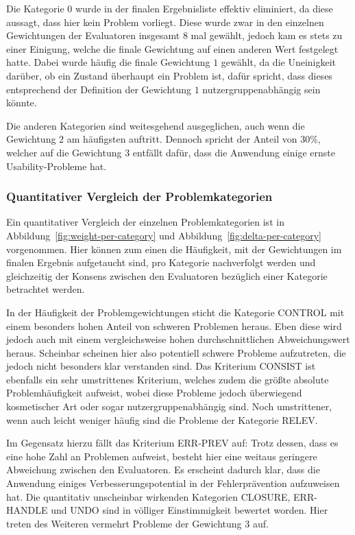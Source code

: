 \documentclass[
  12pt,
  ngerman,
  a4paper,
]{article}
\begin{document}
Die Kategorie \(0\) wurde in der finalen Ergebnisliste effektiv
eliminiert, da diese aussagt, dass hier kein Problem vorliegt. Diese
wurde zwar in den einzelnen Gewichtungen der Evaluatoren insgesamt 8 mal
gewählt, jedoch kam es stets zu einer Einigung, welche die finale
Gewichtung auf einen anderen Wert festgelegt hatte. Dabei wurde häufig
die finale Gewichtung \(1\) gewählt, da die Uneinigkeit darüber, ob ein
Zustand überhaupt ein Problem ist, dafür spricht, dass dieses
entsprechend der Definition der Gewichtung \(1\) nutzergruppenabhängig
sein könnte.

Die anderen Kategorien sind weitesgehend ausgeglichen, auch wenn die
Gewichtung \(2\) am häufigsten auftritt. Dennoch spricht der Anteil von
30\%, welcher auf die Gewichtung \(3\) entfällt dafür, dass die
Anwendung einige ernste Usability-Probleme hat.

\hypertarget{quantitativer-vergleich-der-problemkategorien}{%
\subsubsection{Quantitativer Vergleich der
Problemkategorien}\label{quantitativer-vergleich-der-problemkategorien}}

Ein quantitativer Vergleich der einzelnen Problemkategorien ist in
Abbildung~\ref{fig:weight-per-category} und
Abbildung~\ref{fig:delta-per-category} vorgenommen. Hier können zum
einen die Häufigkeit, mit der Gewichtungen im finalen Ergebnis
aufgetaucht sind, pro Kategorie nachverfolgt werden und gleichzeitig der
Konsens zwischen den Evaluatoren bezüglich einer Kategorie betrachtet
werden.

In der Häufigkeit der Problemgewichtungen sticht die Kategorie CONTROL
mit einem besonders hohen Anteil von schweren Problemen heraus. Eben
diese wird jedoch auch mit einem vergleichsweise hohen
durchschnittlichen Abweichungswert heraus. Scheinbar scheinen hier also
potentiell schwere Probleme aufzutreten, die jedoch nicht besonders klar
verstanden sind. Das Kriterium CONSIST ist ebenfalls ein sehr
umstrittenes Kriterium, welches zudem die größte absolute
Problemhäufigkeit aufweist, wobei diese Probleme jedoch überwiegend
kosmetischer Art oder sogar nutzergruppenabhängig sind. Noch
umstrittener, wenn auch leicht weniger häufig sind die Probleme der
Kategorie RELEV.

Im Gegensatz hierzu fällt das Kriterium ERR-PREV auf: Trotz dessen, dass
es eine hohe Zahl an Problemen aufweist, besteht hier eine weitaus
geringere Abweichung zwischen den Evaluatoren. Es erscheint dadurch
klar, dass die Anwendung einiges Verbesserungspotential in der
Fehlerprävention aufzuweisen hat. Die quantitativ unscheinbar wirkenden
Kategorien CLOSURE, ERR-HANDLE und UNDO sind in völliger Einstimmigkeit
bewertet worden. Hier treten des Weiteren vermehrt Probleme der
Gewichtung \(3\) auf.
\end{document}
